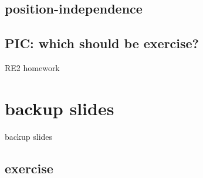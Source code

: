 \subsection{position-independence} 


\subsection{PIC: which should be exercise?}


\begin{frame}{RE2 homework}
\end{frame}




\section{backup slides}
\begin{frame}{backup slides}
\end{frame}

\subsection{exercise}







